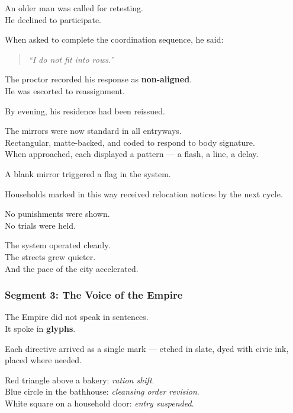\documentclass[9pt]{article}
\begin{document}
An older man was called for retesting.\\
He declined to participate.

When asked to complete the coordination sequence, he said:

\begin{quote}
\textit{“I do not fit into rows.”}
\end{quote}

The proctor recorded his response as \textbf{non-aligned}.\\
He was escorted to reassignment.

By evening, his residence had been reissued.

\vspace{1em}

The mirrors were now standard in all entryways.\\
Rectangular, matte-backed, and coded to respond to body signature.\\
When approached, each displayed a pattern — a flash, a line, a delay.

A blank mirror triggered a flag in the system.

Households marked in this way received relocation notices by the next cycle.

\vspace{1em}

No punishments were shown.\\
No trials were held.

The system operated cleanly.\\
The streets grew quieter.\\
And the pace of the city accelerated.


\newpage

\subsubsection*{Segment 3: The Voice of the Empire}

The Empire did not speak in sentences.\\
It spoke in \textbf{glyphs}.

Each directive arrived as a single mark — etched in slate, dyed with civic ink, placed where needed.

Red triangle above a bakery: \textit{ration shift}.\\
Blue circle in the bathhouse: \textit{cleansing order revision}.\\
White square on a household door: \textit{entry suspended}.
\end{document}
